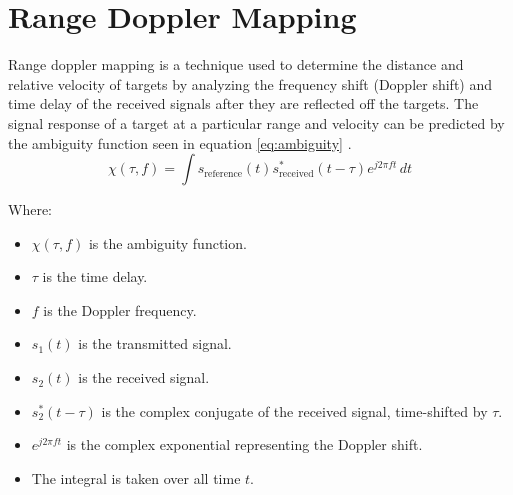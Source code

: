 


\section{Range Doppler Mapping}
Range doppler mapping is a technique used to determine the distance and relative velocity of targets by analyzing the frequency shift (Doppler shift) and time delay of the received signals after they are reflected off the targets. The signal response of a target at a particular range and velocity can be predicted by the ambiguity function seen in equation \ref*{eq:ambiguity} \cite{INTRO2017}. 
\begin{equation}
    \chi(\tau, f) = \int s_{\text{reference}}(t) s_{\text{received}}^*(t - \tau) e^{j2\pi f t} \, dt \label{eq:ambiguity}
\end{equation}

Where:
\begin{multicols}{2}
\begin{itemize}
\item \( \chi(\tau, f) \) is the ambiguity function.
\item \( \tau \) is the time delay.
\item \( f \) is the Doppler frequency.
\item \( s_1(t) \) is the transmitted signal.
\item \( s_2(t) \) is the received signal.
\item \( s_2^*(t - \tau) \) is the complex conjugate of the received signal, time-shifted by \( \tau \).
\item \( e^{j2\pi f t} \) is the complex exponential representing the Doppler shift.
\item The integral is taken over all time \( t \).
\end{itemize}
\end{multicols}

